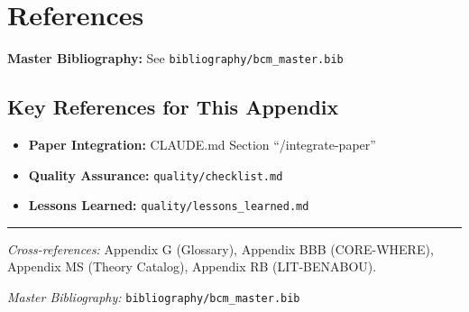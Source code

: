 \section{References}
\label{sec:paperint-references}

\begin{tcolorbox}[colback=blue!5!white, colframe=blue!75!black]
\textbf{Master Bibliography:} See \texttt{bibliography/bcm\_master.bib}
\end{tcolorbox}

\subsection{Key References for This Appendix}

\begin{itemize}[nosep]
    \item \textbf{Paper Integration:} CLAUDE.md Section ``/integrate-paper''
    \item \textbf{Quality Assurance:} \texttt{quality/checklist.md}
    \item \textbf{Lessons Learned:} \texttt{quality/lessons\_learned.md}
\end{itemize}

\nocite{bcm_master}

\vspace{1em}
\hrule
\vspace{0.5em}

\noindent\textit{Cross-references:}
Appendix G (Glossary),
Appendix BBB (CORE-WHERE),
Appendix MS (Theory Catalog),
Appendix RB (LIT-BENABOU).

\noindent\textit{Master Bibliography:} \texttt{bibliography/bcm\_master.bib}

